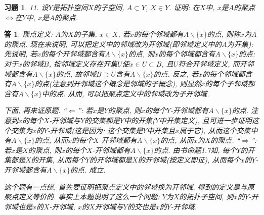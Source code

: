 \documentclass{ctexart}%
\newtheorem*{exercise}{习题}
\newtheorem*{solution}{答}
\theoremstyle{definition}
\theoremstyle{remark}
\begin{document}
\begin{exercise}11. 设$Y$是拓扑空间$X$的子空间, $A\subset Y$, $X\in Y$. 证明: 在$X$中, $x$是$A$的聚点
$\Longleftrightarrow$在$Y$中, $x$是$A$的聚点. 
\end{exercise}
\begin{solution} 聚点定义: $A$为$X$的子集, $x\in X$, 若$x$的每个邻域都有$A\backslash\{x\}$的点, 则称$x$为$A$的聚点. 现在来说明, 可以把定义中的邻域改为开邻域(即邻域定义中的$A$为开集):  先说明, 若$x$的每个开邻域都含有$A\backslash\{x\}$的点, 则$x$的每个邻域都含有$A\backslash\{x\}$的点: 对于$x$的邻域$B$, 按邻域定义存在开集$U$使$x\in U\subset B$, 且$U$符合开邻域定义, 而开邻域都含有$A\backslash\{x\}$的点, 故邻域$B\supset U$含有$A\backslash\{x\}$的点. 反之, 若$x$的每个邻域都含有$A\backslash\{x\}$的点(注意到开邻域这个概念是邻域的子概念), 则显然$x$的每个子邻域都含有$A\backslash\{x\}$中的点. 从而, 可以把聚点定义中的邻域改为子开邻域. 

下面, 再来证原题. ``$\Longleftarrow$'': 若$x$是$Y$的聚点, 则$x$的每个$Y$-开邻域都有$A\backslash\{x\}$的点. 注意到$x$的每个$X$-开邻域与$Y$的交集都是$Y$中的开集($Y$中开集定义), 且可进一步证明这个交集为$x$的$Y$-开邻域(这是因为: 这个交集是$Y$中开集且$x$属于它), 从而这个交集中有$A\backslash\{x\}$的点, 从而$x$的每个$X$-开邻域都有$A\backslash\{x\}$的点, 从而$x$为$X$的聚点. ``$\Longrightarrow$'': 若$x$是$X$的聚点, 则$x$的每个$X$-开邻域都有$A\backslash\{x\}$的点. 由书命题1.7知, 每个$Y$的开集都是$X$的开集, 从而每个$Y$的开邻域都是$X$的开邻域(按定义即证), 从而每个$x$的$Y$-开邻域都含有$A\backslash\{x\}$的点. 成立.  

 这个题有一点绕, 首先要证明把聚点定义中的邻域换为开邻域, 得到的定义是与原聚点定义等价的.  事实上本题说明了这么一个问题: $Y$为$X$的拓扑子空间, 则$x$的$Y$-开邻域也是$x$的$X$-开邻域, $x$的$X$开邻域与$Y$的交也是$x$的$Y$-开邻域.
\end{solution}
\end{document}

